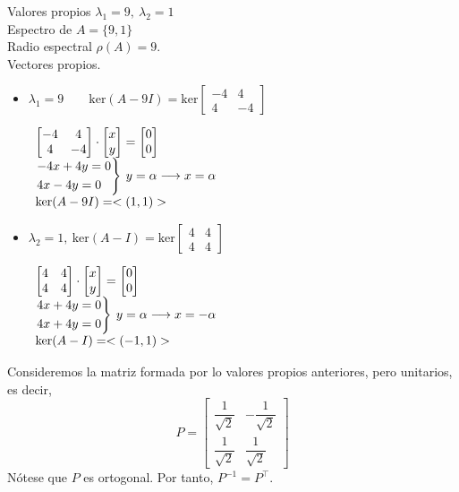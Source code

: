 Valores propios $\lambda_1=9,\:\lambda_2=1$\\
Espectro de $A=\{9,1\}$\\
Radio espectral $\rho(A)=9$.\\
Vectores propios.
\begin{itemize}
	\item $\lambda_1=9\qquad\mathrm{ker}(A-9I)=\mathrm{ker}\begin{bmatrix}
		-4 & 4\\
		4 & -4
	\end{bmatrix}$
	
	$\begin{array}{l}
		\begin{bmatrix}
			-4 & 4\\
			4 & -4
		\end{bmatrix}\cdot\begin{bmatrix}
			x\\
			y
		\end{bmatrix}=\begin{bmatrix}
			0\\
			0
		\end{bmatrix}\\
		\begin{rcases}
			-4x+4y=0\\
			4x-4y=0
		\end{rcases}\:y=\alpha\longrightarrow x=\alpha\\
		\mathrm{ker}(A-9I)=<(1,1)>
	\end{array}$
	\item $\lambda_2=1,\:\mathrm{ker}(A-I)=\mathrm{ker}\begin{bmatrix}
		4 & 4\\
		4 & 4
	\end{bmatrix}$
	
	$\begin{array}{l}
		\begin{bmatrix}
			4 &4\\
			4 & 4
		\end{bmatrix}\cdot\begin{bmatrix}
			x\\
			y
		\end{bmatrix}=\begin{bmatrix}
			0\\
			0
		\end{bmatrix}\\
		\begin{rcases}
			4x+4y=0\\
			4x+4y=0
		\end{rcases}\:y=\alpha\longrightarrow x=-\alpha\\
		\mathrm{ker}(A-I)=<(-1,1)>
	\end{array}$
\end{itemize}
Consideremos la matriz formada por lo valores propios anteriores, pero unitarios, es decir, \[ P=\begin{bmatrix}
	\dfrac{1}{\sqrt{2}} & -\dfrac{1}{\sqrt{2}}\\
	\dfrac{1}{\sqrt{2}} & \dfrac{1}{\sqrt{2}}
\end{bmatrix} \]
Nótese que $P$ es ortogonal. Por tanto, $P^{-1}=P^\intercal$.

